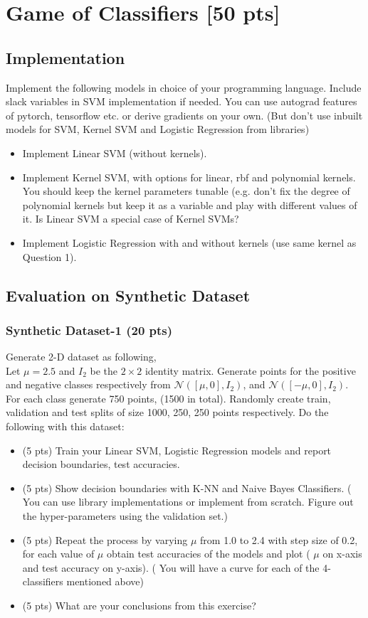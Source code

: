 \documentclass[a4paper]{article}
\theoremstyle{definition}
\begin{document}
\section{Game of Classifiers [50 pts]}
 \subsection{Implementation}
  Implement the following models in choice of your programming language. Include slack variables in SVM implementation if needed. You can use autograd features of pytorch, tensorflow etc. or derive gradients on your own. (But don't use inbuilt models for SVM, Kernel SVM and Logistic Regression from libraries)
  
  \begin{itemize}
      \item Implement Linear SVM (without kernels). 
      \item Implement Kernel SVM, with options for linear, rbf and polynomial kernels. You should keep the kernel parameters tunable (e.g. don't fix the degree of polynomial kernels but keep it as a variable and play with different values of it. Is Linear SVM a special case of Kernel SVMs?
      \item Implement Logistic Regression with and without kernels (use same kernel as Question 1).
      
  \end{itemize}
 \subsection{Evaluation on Synthetic Dataset}
 \subsubsection{Synthetic Dataset-1 (20 pts)}
 Generate 2-D dataset as following, \\
 Let $\mu=2.5$ and $I_2$ be the $2\times2$ identity matrix. Generate points for the positive and negative classes respectively from $\mathcal{N}([\mu,0],I_2)$, and $\mathcal{N}([-\mu,0],I_2)$. For each class generate 750 points, (1500 in total). Randomly create train, validation and test splits of size 1000, 250, 250 points respectively. Do the following with this dataset:
 \begin{itemize}
     \item (5 pts) Train your Linear SVM, Logistic Regression models and report decision boundaries, test accuracies. 
     \item (5 pts) Show decision boundaries with K-NN and Naive Bayes Classifiers. ( You can use library implementations or implement from scratch. Figure out the hyper-parameters using the validation set.) 
     \item (5 pts) Repeat the process by varying $\mu$ from 1.0 to 2.4 with step size of 0.2, for each value of $\mu$ obtain test accuracies of the models and plot ( $\mu$ on x-axis and test accuracy on y-axis). ( You will have a curve for each of the 4-classifiers mentioned above)
     \item (5 pts) What are your conclusions from this exercise?
 \end{itemize}
 
\end{document}
